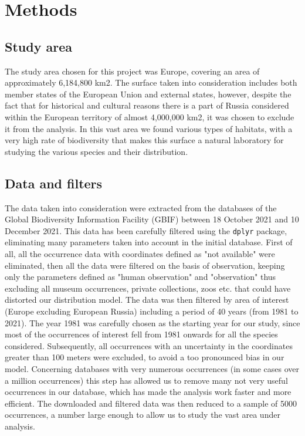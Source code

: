 \documentclass[12pt,a4paper]{article}
\begin{document}
\section{Methods}
\subsection{Study area}
The study area chosen for this project was Europe, covering an area of approximately 6,184,800 km2.
The surface taken into consideration includes both member states of the European Union and external states, however, despite the fact that for historical and cultural reasons there is a part of Russia considered within the European territory of almost 4,000,000 km2, it was chosen to exclude it from the analysis.
In this vast area we found various types of habitats, with a very high rate of biodiversity that makes this surface a natural laboratory for studying the various species and their distribution.
\subsection{Data and filters}
The data taken into consideration were extracted from the databases of the Global Biodiversity Information Facility (GBIF) \citep{gbif} between 18 October 2021 and 10 December 2021.
This data has been carefully filtered using the \texttt{dplyr} package, eliminating many parameters taken into account in the initial database.
First of all, all the occurrence data with coordinates defined as "not available" were eliminated, then all the data were filtered on the basis of observation, keeping only the parameters defined as "human observation" and "observation" thus excluding all museum occurrences, private collections, zoos etc. that could have distorted our distribution model.
The data was then filtered by area of interest (Europe excluding European Russia) including a period of 40 years (from 1981 to 2021).
The year 1981 was carefully chosen as the starting year for our study, since most of the occurrences of interest fell from 1981 onwards for all the species considered.
Subsequently, all occurrences with an uncertainty in the coordinates greater than 100 meters were excluded, to avoid a too pronounced bias in our model.
Concerning databases with very numerous occurrences (in some cases over a million occurrences) this step has allowed us to remove many not very useful occurrences in our database, which has made the analysis work faster and more efficient.
The downloaded and filtered data was then reduced to a sample of 5000 occurrences, a number large enough to allow us to study the vast area under analysis.
\end{document}
